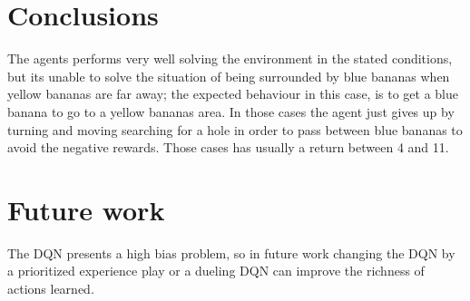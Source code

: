 \documentclass{article}
\begin{document}
\section{Conclusions}
The agents performs very well solving the environment in the stated conditions, but its unable to solve the situation of being surrounded by blue bananas when yellow bananas are far away; the expected behaviour in this case, is to get a blue banana to go to a yellow bananas area.\newline
In those cases the agent just gives up by turning and moving searching for a hole in order to pass between blue bananas to avoid the negative rewards. Those cases has usually a return between 4 and 11.\newline
\section{Future work}
The DQN presents a high bias problem, so in future work changing the DQN by a prioritized experience play or a dueling DQN can improve the richness of actions learned.

\printbibliography
\end{document}
